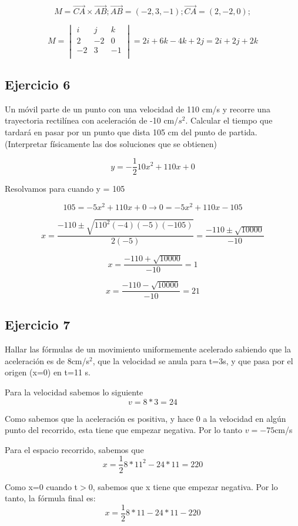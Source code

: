 $$
M = \overrightarrow{CA} \times \overrightarrow{AB};
\overrightarrow{AB} = (-2, 3, -1);
\overrightarrow{CA} = (2, -2, 0);
$$

$$
M = 
\begin{vmatrix}
  i & j & k \\
  2 &-2 & 0 \\
 -2 & 3 &-1 \\
\end{vmatrix}
= 2i + 6k -4k +2j
= 2i + 2j + 2k
$$

\subsection{Ejercicio 6}
Un móvil parte de un punto con una velocidad de
110 cm/s y recorre una trayectoria rectilínea
con aceleración de -10 cm/$s^2$. Calcular el
tiempo que tardará en pasar por un punto
que dista 105 cm del punto de partida.
(Interpretar físicamente las dos soluciones
que se obtienen)

$$
y = -\frac{1}{2}10x^2 + 110x + 0
$$

Resolvamos para cuando y = 105

$$
105 = -5x^2 + 110x + 0 \rightarrow
0 = -5x^2 + 110x - 105
$$

$$
x = \frac{-110 \pm \sqrt{110^2 (-4)(-5)(-105)}}{2(-5)}
= \frac{-110 \pm \sqrt{10000}}{-10}
$$

$$
x = \frac{-110 + \sqrt{10000}}{-10} = 1
$$

$$
x = \frac{-110 - \sqrt{10000}}{-10} = 21
$$

\subsection{Ejercicio 7}
Hallar las fórmulas de un movimiento uniformemente
acelerado sabiendo que la aceleración es de 8cm/s$^2$,
que la velocidad se anula para t=3s, y que pasa
por el origen (x=0) en t=11 s.

Para la velocidad sabemos lo siguiente
$$
v = 8*3 = 24
$$

Como sabemos que la aceleración es positiva, y hace 0 a
la velocidad en algún punto del recorrido, esta tiene
que empezar negativa. Por lo tanto $v = -75$cm/s

Para el espacio recorrido, sabemos que
$$
x = \frac{1}{2}8*11^2 - 24*11 = 220
$$

Como x=0 cuando t$>$0, sabemos que x tiene que
empezar negativa. Por lo tanto, la fórmula final
es:
$$
x = \frac{1}{2}8*11 - 24*11 - 220
$$

